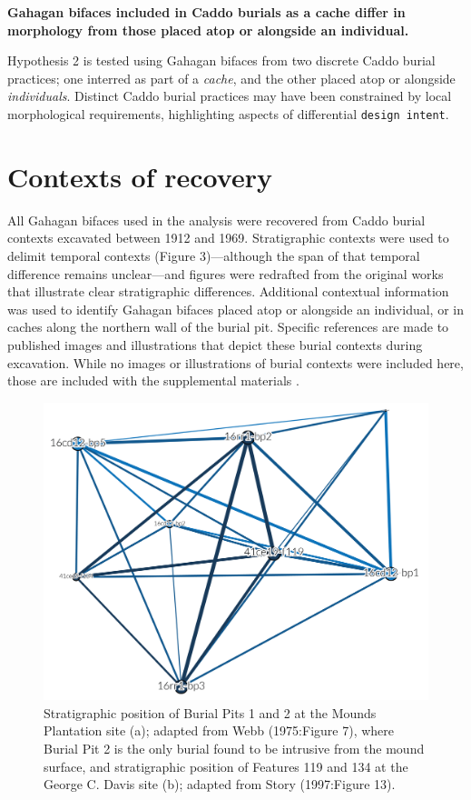 \documentclass[]{interact}
\theoremstyle{plain}%
\theoremstyle{definition}
\theoremstyle{remark}
\begin{document}
\textbf{Gahagan bifaces included in Caddo burials as a cache differ in
morphology from those placed atop or alongside an individual.}

Hypothesis 2 is tested using Gahagan bifaces from two discrete Caddo
burial practices; one interred as part of a \emph{cache}, and the other
placed atop or alongside \emph{individuals}. Distinct Caddo burial
practices may have been constrained by local morphological requirements,
highlighting aspects of differential \texttt{design\ intent}.

\hypertarget{contexts-of-recovery}{%
\section{Contexts of recovery}\label{contexts-of-recovery}}

All Gahagan bifaces used in the analysis were recovered from Caddo
burial contexts excavated between 1912 and 1969. Stratigraphic contexts
were used to delimit temporal contexts (Figure 3)---although the span of
that temporal difference remains unclear---and figures were redrafted
from the original works that illustrate clear stratigraphic differences.
Additional contextual information was used to identify Gahagan bifaces
placed atop or alongside an individual, or in caches along the northern
wall of the burial pit. Specific references are made to published images
and illustrations that depict these burial contexts during excavation.
While no images or illustrations of burial contexts were included here,
those are included with the supplemental materials \citep{RN11065}.

\begin{figure}

{\centering \includegraphics[width=0.8\linewidth]{img/fig03} 

}

\caption{Stratigraphic position of Burial Pits 1 and 2 at the Mounds Plantation site (a); adapted from Webb (1975:Figure 7), where Burial Pit 2 is the only burial found to be intrusive from the mound surface, and stratigraphic position of Features 119 and 134 at the George C. Davis site (b); adapted from Story (1997:Figure 13).}\label{fig:h1a}
\end{figure}
\end{document}
